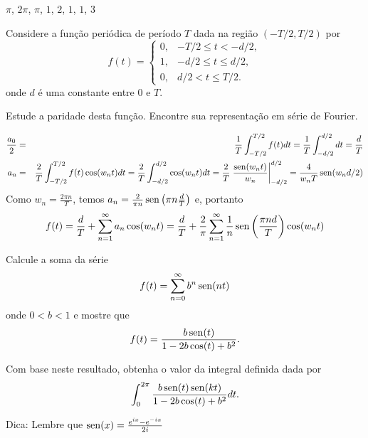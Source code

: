 \begin{Answer}
$\pi$, $2\pi$, $\pi$, $1$, $2$, $1$, $1$, $3$
\end{Answer}


 \begin{Exercise}
Considere a função periódica de período $T$ dada na região $(-T/2,T/2)$ por
$$f(t)=\left\{
\begin{array}{lc}
0,&-T/2\leq t < -d/2,\\
1,&-d/2\leq t \leq d/2,\\
0,&d/2 < t \leq T/2.
\end{array}
\right.$$
onde $d$ é uma constante entre $0$ e $T$.

Estude a paridade desta função. Encontre sua representação em série de Fourier. 
\end{Exercise}
\begin{Answer}
 
\begin{eqnarray*} \frac{a_0}{2}&=&\frac{1}{T}\int_{-T/2}^{T/2}f(t)dt=\frac{1}{T}\int_{-d/2}^{d/2}dt=\frac{d}{T}\\
a_n&=&\frac{2}{T}\int_{-T/2}^{T/2}f(t)\cos(w_nt)dt=\frac{2}{T}\int_{-d/2}^{d/2}\cos(w_nt)dt=\frac{2}{T}\left.\frac{\operatorname{sen}(w_nt)}{w_n}\right|_{-d/2}^{d/2}=\frac{4}{w_nT}\operatorname{sen}(w_nd/2)
\end{eqnarray*}
Como
$w_n=\frac{2\pi n}{T}$, temos $ a_n=\frac{2}{\pi n}\operatorname{sen}\left(\pi n\frac{d}{T}\right)$ e, portanto
$$f(t)=\frac{d}{T}+\sum_{n=1}^\infty a_n \cos(w_n t)=\frac{d}{T}+\frac{2}{\pi}\sum_{n=1}^\infty \frac{1}{n}\operatorname{sen}\left(\frac{\pi n d}{T}\right) \cos(w_n t)$$

\end{Answer}



\begin{Exercise}Calcule a soma da série
$$f(t)=\sum_{n=0}^\infty b^{n}\operatorname{sen}(nt)$$
onde $0<b<1$ e mostre que
$$f(t)=\frac{b\operatorname{sen}(t)}{1-2b\cos(t)+b^2}.$$

Com base neste resultado, obtenha o valor da integral definida dada por
$$\int_0^{2\pi}\frac{b\operatorname{sen}(t)\operatorname{sen}(kt)}{1-2b\cos(t)+b^2}dt.$$
\end{Exercise}
\begin{Answer}
 Dica: Lembre que $\operatorname{sen}(x)=\frac{e^{ix}-e^{-ix}}{2i}$
\end{Answer}



